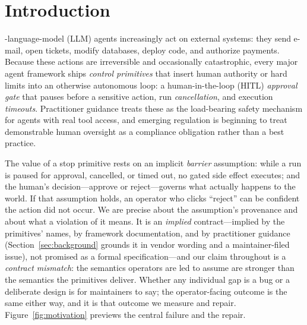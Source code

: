 \documentclass[10pt,journal,compsoc]{IEEEtran}
\begin{document}
\maketitle
\IEEEdisplaynontitleabstractindextext
\IEEEpeerreviewmaketitle

\section{Introduction}
\label{sec:intro}
-language-model (LLM) agents increasingly act on external
systems: they send e-mail, open tickets, modify databases, deploy code, and
authorize payments. Because these actions are irreversible and occasionally
catastrophic, every major agent framework ships \emph{control primitives} that
insert human authority or hard limits into an otherwise autonomous loop: a
human-in-the-loop (HITL) \emph{approval gate} that pauses before a sensitive
action, run \emph{cancellation}, and execution \emph{timeouts}. Practitioner
guidance treats these as the load-bearing safety mechanism for agents with real
tool access, and emerging regulation is beginning to treat demonstrable human
oversight as a compliance obligation rather than a best practice.

The value of a stop primitive rests on an implicit \emph{barrier} assumption:
while a run is paused for approval, cancelled, or timed out, no gated side effect
executes; and the human's decision---approve or reject---governs what actually
happens to the world. If that assumption holds, an operator who clicks
``reject'' can be confident the action did not occur. We are precise about the
assumption's provenance and about what a violation of it means. It is an
\emph{implied} contract---implied by the primitives' names, by framework
documentation, and by practitioner guidance (Section~\ref{sec:background}
grounds it in vendor wording and a maintainer-filed issue), not promised as a
formal specification---and our claim throughout is a \emph{contract mismatch}:
the semantics operators are led to assume are stronger than the semantics the
primitives deliver. Whether any individual gap is a bug or a deliberate design
is for maintainers to say; the operator-facing outcome is the same either way,
and it is that outcome we measure and repair. Figure~\ref{fig:motivation}
previews the central failure and the repair.
\end{document}
